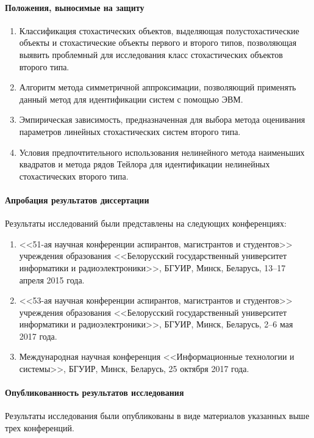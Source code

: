 \paragraph{Положения, выносимые на защиту}

\begin{enumerate}
\item Классификация стохастических объектов, выделяющая полустохастические
  объекты и стохастические объекты первого и второго типов,
  позволяющая выявить проблемный для исследования класс стохастических
  объектов второго типа.
\item Алгоритм метода симметричной аппроксимации,
  позволяющий применять данный метод для идентификации систем с помощью ЭВМ.
\item Эмпирическая зависимость, предназначенная для выбора метода
  оценивания параметров линейных стохастических систем второго типа.
\item Условия предпочтительного использования нелинейного метода наименьших квадратов и
  метода рядов Тейлора для идентификации нелинейных стохастических второго типа.
\end{enumerate}

\paragraph{Апробация результатов диссертации}
Результаты исследований были представлены на следующих конференциях:
\begin{enumerate}
\item <<51-ая научная конференции аспирантов, магистрантов и студентов>>
  учреждения образования
  <<Белорусский государственный университет информатики и радиоэлектроники>>,
  БГУИР, Минск, Беларусь, 13--17 апреля 2015 года.
\item <<53-ая научная конференции аспирантов, магистрантов и студентов>>
  учреждения образования
  <<Белорусский государственный университет информатики и радиоэлектроники>>,
  БГУИР, Минск, Беларусь, 2--6 мая 2017 года.
\item Международная научная конференция
  <<Информационные технологии и системы>>,
  БГУИР, Минск, Беларусь, 25 октября 2017 года.
\end{enumerate}

\paragraph{Опубликованность результатов исследования}
Результаты исследования были опубликованы в виде материалов
указанных выше трех конференций.


